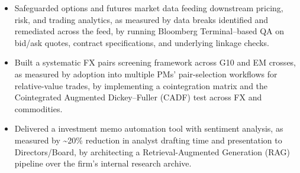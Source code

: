 \documentclass{article}
\begin{document}
\begin{itemize}
  \item Safeguarded options and futures market data feeding downstream pricing, risk, and trading analytics, as measured by data breaks identified and remediated across the feed, by running Bloomberg Terminal--based QA on bid/ask quotes, contract specifications, and underlying linkage checks.
  \item Built a systematic FX pairs screening framework across G10 and EM crosses, as measured by adoption into multiple PMs' pair-selection workflows for relative-value trades, by implementing a cointegration matrix and the Cointegrated Augmented Dickey--Fuller (CADF) test across FX and commodities.
  \item Delivered a  investment memo automation tool with sentiment analysis, as measured by \textasciitilde{}20\% reduction in analyst drafting time and presentation to Directors/Board, by architecting a Retrieval-Augmented Generation (RAG) pipeline over the firm's internal research archive.
\end{itemize}

\cvpublications

\begin{cvskills}
\end{cvskills}
\end{document}
